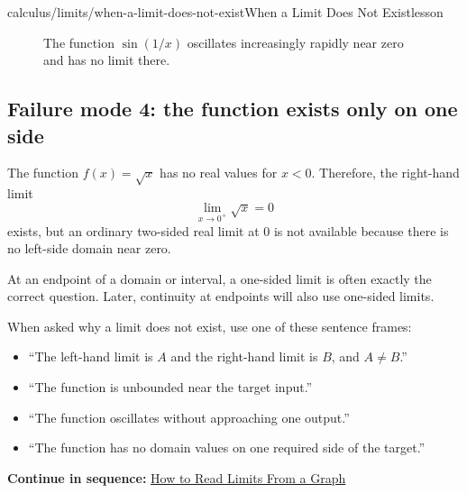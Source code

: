 \documentclass[11pt,openany]{book}
\theoremstyle{bgplain}
\newcommand{\webnext}[2]{%
  \par\addvspace{1.2em}\noindent{\color{BGLine}\rule{\textwidth}{0.35pt}}\par\smallskip
  {\small\color{BGGray}\textbf{Continue in sequence:} \hyperlink{web:#1}{#2}}\par
}
\begin{document}
\begin{webpage}{calculus/limits/when-a-limit-does-not-exist}{When a Limit Does Not Exist}{lesson}
\begin{figure}[htbp]
\centering
{}
\caption{The function \(\sin(1/x)\) oscillates increasingly rapidly near zero and has no limit there.}
\label{fig:oscillation}
\end{figure}

\subsection{Failure mode 4: the function exists only on one side}

The function \(f(x)=\sqrt{x}\) has no real values for \(x<0\). Therefore, the right-hand limit
\[
  \lim_{x\to0^+}\sqrt{x}=0
\]
exists, but an ordinary two-sided real limit at \(0\) is not available because there is no left-side domain near zero.

At an endpoint of a domain or interval, a one-sided limit is often exactly the correct question. Later, continuity at endpoints will also use one-sided limits.

\begin{bghomework}
When asked why a limit does not exist, use one of these sentence frames:
\begin{itemize}
  \item ``The left-hand limit is \(A\) and the right-hand limit is \(B\), and \(A\ne B\).''
  \item ``The function is unbounded near the target input.''
  \item ``The function oscillates without approaching one output.''
  \item ``The function has no domain values on one required side of the target.''
\end{itemize}
\end{bghomework}
\webnext{calculus/limits/read-limits-from-graphs}{How to Read Limits From a Graph}
\end{webpage}
\end{document}
